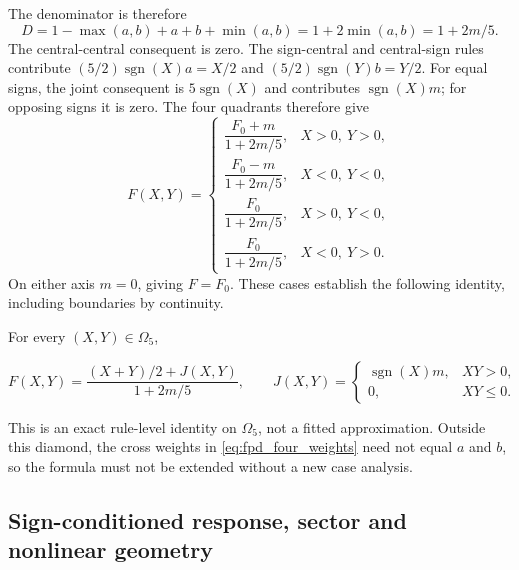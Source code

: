 The denominator is therefore
\begin{equation}
 D=1-\max(a,b)+a+b+\min(a,b)
  =1+2\min(a,b)=1+2m/5.
 \label{eq:fpd_denominator}
\end{equation}
The central-central consequent is zero. The sign-central and
central-sign rules contribute $(5/2)\operatorname{sgn}(X)a=X/2$
and $(5/2)\operatorname{sgn}(Y)b=Y/2$.
For equal signs, the joint consequent is
$5\operatorname{sgn}(X)$ and contributes $\operatorname{sgn}(X)m$;
for opposing signs it is zero. The four quadrants therefore give
\begin{equation}
 F(X,Y)=\begin{cases}
 \dfrac{F_0+m}{1+2m/5},&X>0,\ Y>0,\\[4pt]
 \dfrac{F_0-m}{1+2m/5},&X<0,\ Y<0,\\[4pt]
 \dfrac{F_0}{1+2m/5},&X>0,\ Y<0,\\[4pt]
 \dfrac{F_0}{1+2m/5},&X<0,\ Y>0.
 \end{cases}
 \label{eq:fpi_quadrants}
\end{equation}
On either axis $m=0$, giving $F=F_0$. These cases establish the following
identity, including boundaries by continuity.
\begin{btdproposition}
\label{prop:fpi_central}
For every $(X,Y)\in\Omega_5$,

\begin{equation}
 F(X,Y)=\frac{(X+Y)/2+J(X,Y)}{1+2m/5},\qquad
 J(X,Y)=\begin{cases}\operatorname{sgn}(X)m,&XY>0,\\0,&XY\le0.
 \end{cases}
 \label{eq:fpi_central}
\end{equation}
\end{btdproposition}
This is an exact rule-level identity on $\Omega_5$, not a fitted
approximation. Outside this diamond, the cross weights in
\eqref{eq:fpd_four_weights} need not equal $a$ and $b$, so the formula
must not be extended without a new case analysis.

\subsection{Sign-conditioned response, sector and nonlinear geometry}

